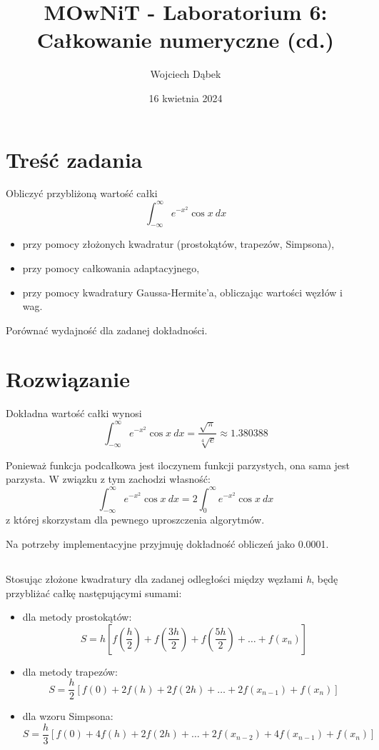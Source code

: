\documentclass{article}
\title{MOwNiT - Laboratorium 6:\\
Całkowanie numeryczne (cd.)}
\author{Wojciech Dąbek}
\date{16 kwietnia 2024}
\begin{document}
\maketitle

\section{Treść zadania}

Obliczyć przybliżoną wartość całki
\[\int_{-\infty}^\infty e^{-x^2} \cos x\ dx\]

\begin{itemize}
    \item przy pomocy złożonych kwadratur (prostokątów, trapezów, Simpsona),
    \item przy pomocy całkowania adaptacyjnego,
    \item przy pomocy kwadratury Gaussa-Hermite’a, obliczając wartości węzłów i wag.
\end{itemize}

\noindent
Porównać wydajność dla zadanej dokładności.

\section{Rozwiązanie}

Dokładna wartość całki wynosi
\[\int_{-\infty}^\infty e^{-x^2} \cos x\ dx = \frac{\sqrt{\pi}}{\sqrt[4]{e}} \approx 1.380388\]

\noindent
Ponieważ funkcja podcałkowa jest iloczynem funkcji parzystych, ona sama jest parzysta. W związku z tym zachodzi własność:
\[\int_{-\infty}^\infty e^{-x^2} \cos x\ dx = 2 \int_0^\infty e^{-x^2} \cos x\ dx\]
\noindent
z której skorzystam dla pewnego uproszczenia algorytmów.

\vspace{5mm}
\noindent
Na potrzeby implementacyjne przyjmuję dokładność obliczeń jako 0.0001.

\subsection{}
Stosując złożone kwadratury dla zadanej odległości między węzłami \textit{h}, będę przybliżać całkę następującymi sumami:

\begin{itemize}
    \item dla metody prostokątów:
    \[S = h \left[ f\left(\frac{h}{2}\right) + f\left(\frac{3h}{2}\right) + f\left(\frac{5h}{2}\right) + \ldots + f(x_n) \right]\]
    \item dla metody trapezów:
    \[S = \frac{h}{2} [ f(0) + 2f(h) + 2f(2h) + \ldots + 2f(x_{n-1}) + f(x_n) ]\]
    \item dla wzoru Simpsona:
    \[S = \frac{h}{3} [ f(0) + 4f(h) + 2f(2h) + \ldots + 2f(x_{n-2}) + 4f(x_{n-1}) + f(x_n) ]\]
\end{itemize}
\end{document}
